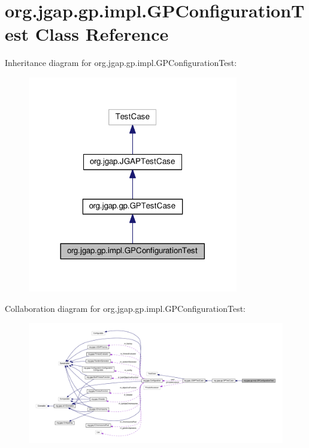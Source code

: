 \hypertarget{classorg_1_1jgap_1_1gp_1_1impl_1_1_g_p_configuration_test}{\section{org.\-jgap.\-gp.\-impl.\-G\-P\-Configuration\-Test Class Reference}
\label{classorg_1_1jgap_1_1gp_1_1impl_1_1_g_p_configuration_test}
}


Inheritance diagram for org.\-jgap.\-gp.\-impl.\-G\-P\-Configuration\-Test\-:
\nopagebreak
\begin{figure}[H]
\begin{center}
\leavevmode
\includegraphics[width=260pt]{classorg_1_1jgap_1_1gp_1_1impl_1_1_g_p_configuration_test__inherit__graph}
\end{center}
\end{figure}


Collaboration diagram for org.\-jgap.\-gp.\-impl.\-G\-P\-Configuration\-Test\-:
\nopagebreak
\begin{figure}[H]
\begin{center}
\leavevmode
\includegraphics[width=350pt]{classorg_1_1jgap_1_1gp_1_1impl_1_1_g_p_configuration_test__coll__graph}
\end{center}
\end{figure}
